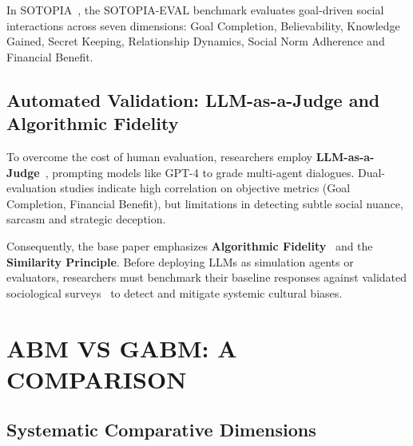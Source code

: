 \documentclass[12pt,a4paper]{report}
\begin{document}
In SOTOPIA~\cite{sotopia2024}, the SOTOPIA-EVAL benchmark evaluates goal-driven social interactions across seven dimensions: Goal Completion, Believability, Knowledge Gained, Secret Keeping, Relationship Dynamics, Social Norm Adherence and Financial Benefit.

\section{Automated Validation: LLM-as-a-Judge and Algorithmic Fidelity}
\label{sec:llm_as_judge}

To overcome the cost of human evaluation, researchers employ \textbf{LLM-as-a-Judge}~\cite{zheng2023judging}, prompting models like GPT-4 to grade multi-agent dialogues. Dual-evaluation studies indicate high correlation on objective metrics (Goal Completion, Financial Benefit), but limitations in detecting subtle social nuance, sarcasm and strategic deception.

Consequently, the base paper emphasizes \textbf{Algorithmic Fidelity}~\cite{argyle2023out} and the \textbf{Similarity Principle}. Before deploying LLMs as simulation agents or evaluators, researchers must benchmark their baseline responses against validated sociological surveys~\cite{serapio2023personality} to detect and mitigate systemic cultural biases.


\chapter{ABM VS GABM: A COMPARISON}
\label{chap:abm_vs_gabm}

\section{Systematic Comparative Dimensions}
\label{sec:comp_dimensions}
\end{document}
